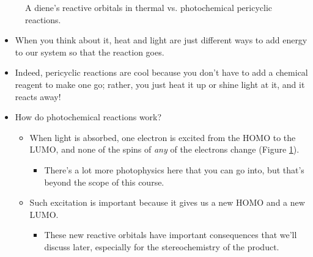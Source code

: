 \documentclass[../notes.tex]{subfiles}
\begin{document}
\begin{itemize}
\begin{figure}[h!]
        \caption{A diene's reactive orbitals in thermal vs. photochemical pericyclic reactions.}
        \label{fig:thermPhot}
    \end{figure}
    \begin{itemize}
        \item When you think about it, heat and light are just different ways to add energy to our system so that the reaction goes.
        \item Indeed, pericyclic reactions are cool because you don't have to add a chemical reagent to make one go; rather, you just heat it up or shine light at it, and it reacts away!
        \item How do photochemical reactions work?
        \begin{itemize}
            \item When light is absorbed, one electron is excited from the HOMO to the LUMO, and none of the spins of \emph{any} of the electrons change (Figure \ref{fig:thermPhot}).
            \begin{itemize}
                \item There's a lot more photophysics here that you can go into, but that's beyond the scope of this course.
            \end{itemize}
            \item Such excitation is important because it gives us a new HOMO and a new LUMO.
            \begin{itemize}
                \item These new reactive orbitals have important consequences that we'll discuss later, especially for the stereochemistry of the product.

\end{itemize}
\end{itemize}
\end{itemize}
\end{itemize}
\end{document}
